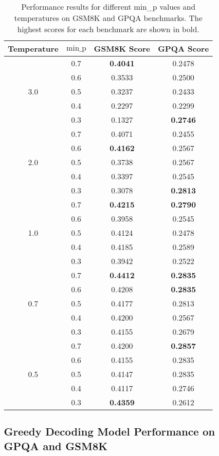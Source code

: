 \documentclass{article}
\begin{document}
\begin{table}[ht]
\centering
\begin{tabular}{|c|c|c|c|}
\hline
Temperature & $\text{min\_p}$ & GSM8K Score & GPQA Score \\
\hline
\multirow{5}{*}{3.0} & 0.7 & \textbf{0.4041} & 0.2478 \\
& 0.6 & 0.3533 & 0.2500 \\
& 0.5 & 0.3237 & 0.2433 \\
& 0.4 & 0.2297 & 0.2299 \\
& 0.3 & 0.1327 & \textbf{0.2746} \\
\hline
\multirow{5}{*}{2.0} & 0.7 & 0.4071 & 0.2455 \\
& 0.6 & \textbf{0.4162} & 0.2567 \\
& 0.5 & 0.3738 & 0.2567 \\
& 0.4 & 0.3397 & 0.2545 \\
& 0.3 & 0.3078 & \textbf{0.2813} \\
\hline
\multirow{5}{*}{1.0} & 0.7 & \textbf{0.4215} & \textbf{0.2790} \\
& 0.6 & 0.3958 & 0.2545 \\
& 0.5 & 0.4124 & 0.2478 \\
& 0.4 & 0.4185 & 0.2589 \\
& 0.3 & 0.3942 & 0.2522 \\
\hline
\multirow{5}{*}{0.7} & 0.7 & \textbf{0.4412} & \textbf{0.2835} \\
& 0.6 & 0.4208 & \textbf{0.2835} \\
& 0.5 & 0.4177 & 0.2813 \\
& 0.4 & 0.4200 & 0.2567 \\
& 0.3 & 0.4155 & 0.2679 \\
\hline
\multirow{5}{*}{0.5} & 0.7 & 0.4200 & \textbf{0.2857} \\
& 0.6 & 0.4155 & 0.2835 \\
& 0.5 & 0.4147 & 0.2835 \\
& 0.4 & 0.4117 & 0.2746 \\
& 0.3 & \textbf{0.4359} & 0.2612 \\
\hline
\end{tabular}
\caption{Performance results for different min\_p values and temperatures on GSM8K and GPQA benchmarks. The highest scores for each benchmark are shown in bold.}
\label{tab:performance_results}
\end{table}

\subsection{Greedy Decoding Model Performance on GPQA and GSM8K}
\end{document}
